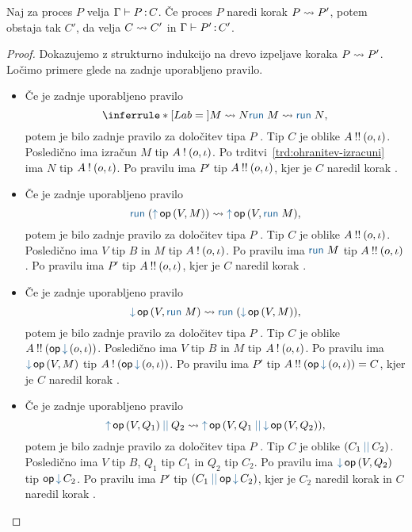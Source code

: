 \begin{izrek}[o ohranitvi]\label{izr:ohranitev}
	Naj za proces $P$ velja $\Gamma \vdash P \mathinner{:} C$. Če proces $P$ naredi korak $P \leadsto P'$, potem obstaja tak $C'$, da velja $C \rightsquigarrow C'$ in $\Gamma \vdash P' \mathinner{:} C'$.
\end{izrek}

\begin{proof}
	Dokazujemo z strukturno indukcijo na drevo izpeljave koraka $P \leadsto P'$.
	Ločimo primere glede na zadnje uporabljeno pravilo.
	
	\begin{itemize}
		\item Če je zadnje uporabljeno pravilo
		$$
		\coopinfer{}{
			M \reduces N
		}{
			\tmrun M \reduces \tmrun N
		},$$
		potem je bilo zadnje pravilo za določitev tipa $P$ . Tip $C$ je oblike $A \mathbin{!!} (o, \iota)$.
		Posledično ima izračun $M$ tip $A \mathbin{!} (o, \iota)$. Po trditvi~\ref{trd:ohranitev-izracuni} ima $N$ tip $A \mathbin{!} (o, \iota)$.
		Po pravilu  ima $P'$ tip $A \mathbin{!!} (o, \iota)$, kjer je $C$ naredil korak .
	
		\item Če je zadnje uporabljeno pravilo
		$$\tmrun {(\tmopout{op}{V}{M})}  \reduces \tmopout{op}{V}{\tmrun M},$$
		potem je bilo zadnje pravilo za določitev tipa $P$ . Tip $C$ je oblike $A \mathbin{!!} (o, \iota)$.
		Posledično ima $V$ tip $B$ in $M$ tip $A \mathbin{!} (o, \iota)$.
		Po pravilu  ima $\tmrun{M}$ tip $A \mathbin{!!} (o, \iota)$.
		Po pravilu  ima $P'$ tip $A \mathbin{!!} (o, \iota)$, kjer je $C$ naredil korak .
		
		\item Če je zadnje uporabljeno pravilo
		$$\tmopin{op}{V}{\tmrun M} \reduces \tmrun {(\tmopin{op}{V}{M})},$$
		potem je bilo zadnje pravilo za določitev tipa $P$ . Tip $C$ je oblike $\tyrun{A}{\opincomp{op}{(\o, \i)}}$.
		Posledično ima $V$ tip $B$ in $M$ tip $A \mathbin{!} (o, \iota)$.
		Po pravilu  ima $\tmopin{op}{V}{M}$ tip $\tycomp{A}{\opincomp{op}{(\o, \i)}}$.
		Po pravilu  ima $P'$ tip $\tyrun{A}{\opincomp{op}{(\o, \i)}} = C$, kjer je $C$ naredil korak .
		
		\item Če je zadnje uporabljeno pravilo
		$$\tmpar{\tmopout{op}{V}{Q_1}}{Q_2} \reduces \tmopout{op}{V}{\tmpar{Q_1}{\tmopin{op}{V}{Q_2}}},$$
		potem je bilo zadnje pravilo za določitev tipa $P$ . Tip $C$ je oblike $\typar{C_1}{C_2}$.
		Posledično ima $V$ tip $B$, $Q_1$ tip $C_1$ in $Q_2$ tip $C_2$.
		Po pravilu  ima $\tmopin{op}{V}{Q_2}$ tip $\opincomp{op}{C_2}$.
		Po pravilu  ima $P'$ tip $\typar{C_1}{\opincomp{op}{C_2}}$, kjer je $C_2$ naredil korak  in $C$ naredil korak .


\end{itemize}
\end{proof}
